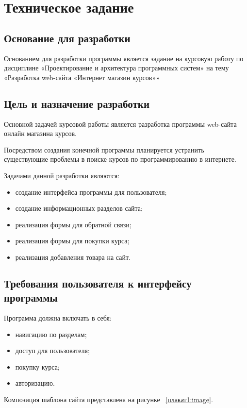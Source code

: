 \section{Техническое задание}
\subsection{Основание для разработки}

Основанием для разработки программы является задание на курсовую работу по дисциплине «Проектирование и архитектура программных систем» на тему «Разработка web-сайта «Интернет магазин курсов»»

\subsection{Цель и назначение разработки}

Основной задачей курсовой работы является разработка программы web-сайта онлайн магазина курсов.

Посредством создания конечной программы планируется устранить существующие проблемы в поиске курсов по программированию в интернете.

Задачами данной разработки являются:
\begin{itemize}
	\item создание интерфейса программы для пользователя;
	\item создание информационных разделов сайта;
	\item реализация формы для обратной связи;
	\item реализация формы для покупки курса;
	\item реализация добавления товара на сайт.
\end{itemize}

\subsection{Требования пользователя к интерфейсу программы}

Программа должна включать в себя:
\begin{itemize}
	\item навигацию по разделам;
	\item доступ для пользователя;
	\item покупку курса;
	\item авторизацию.
\end{itemize}

Композиция шаблона сайта представлена на рисунке ~\ref{плакат1:image}.

